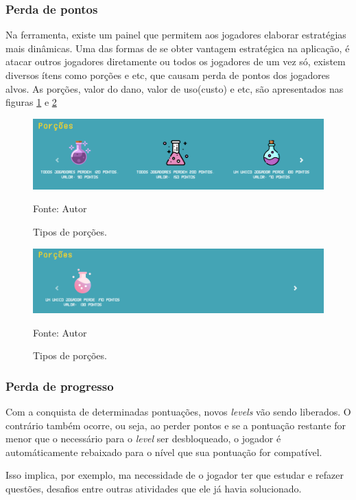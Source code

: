 \subsubsection{Perda de pontos}
Na ferramenta, existe um painel que permitem aos jogadores elaborar estratégias mais dinâmicas. Uma das formas de se obter vantagem estratégica na aplicação, é atacar
outros jogadores diretamente ou todos os jogadores de um vez só, existem diversos ítens como porções e etc, que causam perda de pontos
dos jogadores alvos. As porções, valor do dano, valor de uso(custo) e etc, são apresentados nas figuras \ref{porcoes} e \ref{porcoes2}

\begin{figure}[h]
	\centering
	\includegraphics[keepaspectratio=true,scale=0.4]{figuras/p1.png}
	\caption{Tipos de porções.}
	Fonte: Autor
	\label{porcoes}
\end{figure}

\begin{figure}[h]
	\centering
	\includegraphics[keepaspectratio=true,scale=0.4]{figuras/p2.png}
	\caption{Tipos de porções.}
	Fonte: Autor
	\label{porcoes2}
\end{figure}

\subsubsection{Perda de progresso}
Com a conquista de determinadas pontuações, novos \textit{levels} vão sendo liberados. O contrário também ocorre, ou seja, ao perder 
pontos e se a pontuação restante for menor que o necessário para o \textit{level} ser desbloqueado, o jogador é 
automáticamente rebaixado para o nível que sua pontuação for compatível.

Isso implica, por exemplo, ma necessidade de o jogador ter que estudar e refazer questões, desafios entre outras atividades que 
ele já havia solucionado.

